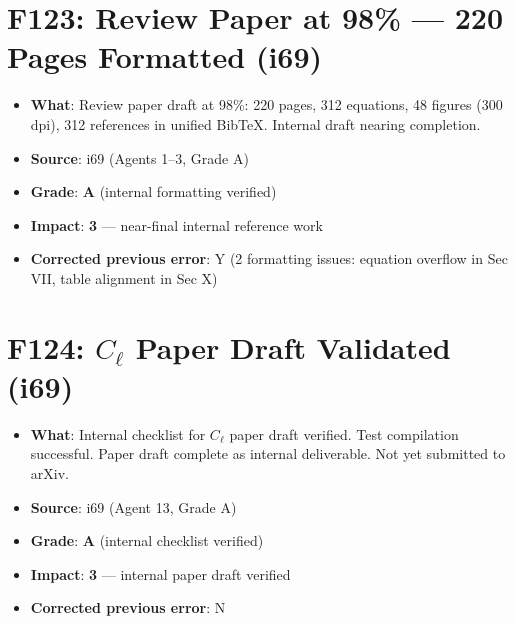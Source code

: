 \documentclass[11pt,a4paper]{article}
\newcommand{\grade}[1]{\textbf{#1}}
\newcommand{\impact}[1]{\textbf{#1}}
\begin{document}
\section{F123: Review Paper at 98\% --- 220 Pages Formatted (i69)}
\begin{itemize}[nosep]
\item \textbf{What}: Review paper draft at 98\%: 220 pages, 312 equations, 48 figures (300 dpi), 312 references in unified BibTeX. Internal draft nearing completion.
\item \textbf{Source}: i69 (Agents 1--3, Grade A)
\item \textbf{Grade}: \grade{A} (internal formatting verified)
\item \textbf{Impact}: \impact{3} --- near-final internal reference work
\item \textbf{Corrected previous error}: Y (2 formatting issues: equation overflow in Sec VII, table alignment in Sec X)
\end{itemize}

\section{F124: $C_\ell$ Paper Draft Validated (i69)}
\begin{itemize}[nosep]
\item \textbf{What}: Internal checklist for $C_\ell$ paper draft verified. Test compilation successful. Paper draft complete as internal deliverable. Not yet submitted to arXiv.
\item \textbf{Source}: i69 (Agent 13, Grade A)
\item \textbf{Grade}: \grade{A} (internal checklist verified)
\item \textbf{Impact}: \impact{3} --- internal paper draft verified
\item \textbf{Corrected previous error}: N
\end{itemize}

\end{document}
